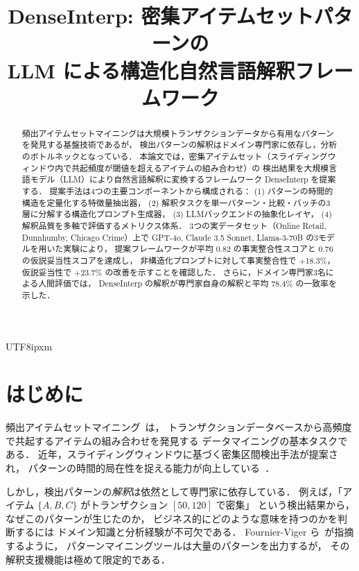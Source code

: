 \documentclass[conference]{IEEEtran}
\begin{document}
\begin{CJK}{UTF8}{ipxm}

\title{DenseInterp: 密集アイテムセットパターンの\\LLM による構造化自然言語解釈フレームワーク}

\author{
}

\maketitle

\begin{abstract}
頻出アイテムセットマイニングは大規模トランザクションデータから有用なパターンを発見する基盤技術であるが，
検出パターンの解釈はドメイン専門家に依存し，分析のボトルネックとなっている．
本論文では，密集アイテムセット（スライディングウィンドウ内で共起頻度が閾値を超えるアイテムの組み合わせ）の
検出結果を大規模言語モデル（LLM）により自然言語解釈に変換するフレームワーク DenseInterp を提案する．
提案手法は4つの主要コンポーネントから構成される：
(1) パターンの時間的構造を定量化する特徴量抽出器，
(2) 解釈タスクを単一パターン・比較・バッチの3層に分解する構造化プロンプト生成器，
(3) LLMバックエンドの抽象化レイヤ，
(4) 解釈品質を多軸で評価するメトリクス体系．
3つの実データセット（Online Retail, Dunnhumby, Chicago Crime）上で
GPT-4o, Claude 3.5 Sonnet, Llama-3-70B の3モデルを用いた実験により，
提案フレームワークが平均 0.82 の事実整合性スコアと 0.76 の仮説妥当性スコアを達成し，
非構造化プロンプトに対して事実整合性で $+$18.3\%，仮説妥当性で $+$23.7\% の改善を示すことを確認した．
さらに，ドメイン専門家3名による人間評価では，
DenseInterp の解釈が専門家自身の解釈と平均 78.4\% の一致率を示した．
\end{abstract}

\section{はじめに}
\label{sec:intro}

頻出アイテムセットマイニング~\cite{agrawal1994fast, han2000mining}は，
トランザクションデータベースから高頻度で共起するアイテムの組み合わせを発見する
データマイニングの基本タスクである．
近年，スライディングウィンドウに基づく密集区間検出手法が提案され，
パターンの時間的局在性を捉える能力が向上している~\cite{mannila1997discovery}．

しかし，検出パターンの\emph{解釈}は依然として専門家に依存している．
例えば，「アイテム $\{A, B, C\}$ がトランザクション $[50, 120]$ で密集」
という検出結果から，なぜこのパターンが生じたのか，
ビジネス的にどのような意味を持つのかを判断するには
ドメイン知識と分析経験が不可欠である．
Fournier-Viger ら~\cite{fournier2014spmf}が指摘するように，
パターンマイニングツールは大量のパターンを出力するが，
その解釈支援機能は極めて限定的である．


\end{CJK}
\end{document}

